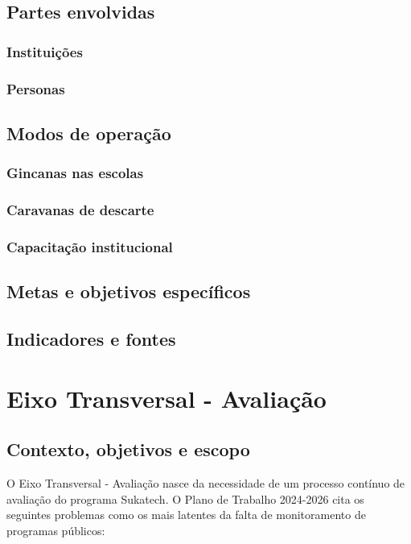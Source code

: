 \documentclass[
	12pt,				%
	openright,			%
	twoside,			%
	a4paper,			%
	english,			%
	french,				%
	spanish,			%
	brazil,				%
	]{abntex2}
\begin{document}
\section{Partes envolvidas}
\subsection{Instituições}

\subsection{Personas}

\section{Modos de operação}
\subsection{Gincanas nas escolas}
\subsection{Caravanas de descarte}
\subsection{Capacitação institucional}

\section{Metas e objetivos específicos}
\section{Indicadores e fontes}

\chapter{Eixo Transversal - Avaliação}

\section{Contexto, objetivos e escopo}

O Eixo Transversal - Avaliação nasce da necessidade de um processo contínuo de avaliação do programa Sukatech. O Plano de Trabalho 2024-2026 cita os seguintes problemas como os mais latentes da falta de monitoramento de programas públicos:
\end{document}
